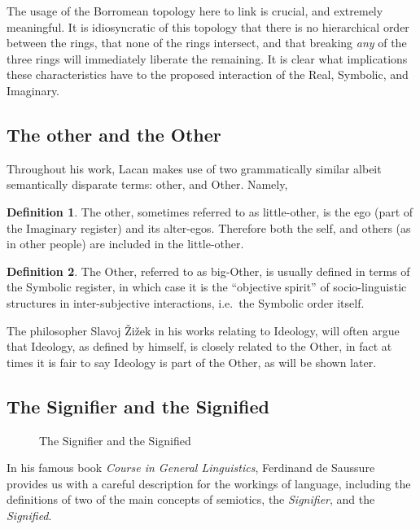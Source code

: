 \documentclass[11pt,letterpaper]{article}
\theoremstyle{definition}
\newtheorem{defn}{Definition}[section]
\begin{document}
The usage of the Borromean topology here to link is crucial, and extremely meaningful. It is idiosyncratic of this topology that there is no hierarchical order between the rings, that none of the rings intersect, and that breaking \emph{any} of the three rings will immediately liberate the remaining. It is clear what implications these characteristics have to the proposed interaction of the Real, Symbolic, and Imaginary.

\subsection{The other and the Other}

Throughout his work, Lacan makes use of two grammatically similar albeit semantically disparate terms: other, and Other. Namely,
\begin{defn}\label{def:little-other}
	The other, sometimes referred to as little-other, is the ego (part of the Imaginary register) and its alter-egos. Therefore both the self, and others (as in other people) are included in the little-other.\autocite{sep-lacan}
\end{defn}
\begin{defn}\label{def:big-other}
	The Other, referred to as big-Other, is usually defined in terms of the Symbolic register, in which case it is the ``objective spirit'' of socio-linguistic structures in inter-subjective interactions, i.e.\ the Symbolic order itself.\autocite{sep-lacan}
\end{defn}

The philosopher Slavoj Žižek in his works relating to Ideology, will often argue that Ideology, as defined by himself, is closely related to the Other, in fact at times it is fair to say Ideology is part of the Other, as will be shown later.
\newpage
\subsection{The Signifier and the Signified}
\begin{figure}
	\centering
	\caption{The Signifier and the Signified}\label{fig:sig}
\end{figure}
In his famous book \textit{Course in General Linguistics}\autocite{saussure_bally_sechehaye_urbain_riedlinger_2016}, Ferdinand de Saussure provides us with a careful description for the workings of language, including the definitions of two of the main concepts of semiotics, the \emph{Signifier}, and the \emph{Signified}.
\end{document}

